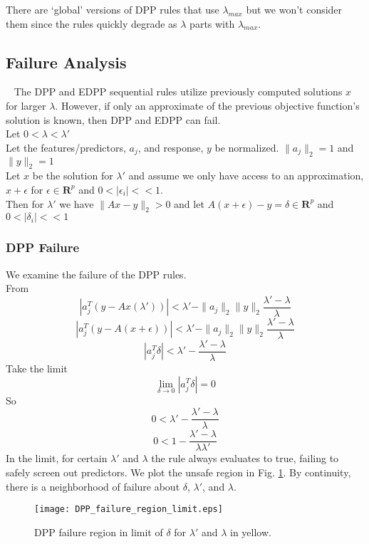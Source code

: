 \documentclass{article}
\begin{document}
There are `global' versions of DPP rules that use $\lambda_{max}$ but we won't consider them since the rules quickly degrade as $\lambda$ parts with $\lambda_{max}$.



\subsection*{Failure Analysis}

\qquad ~ The DPP and EDPP sequential rules utilize previously computed solutions $x$ for larger $\lambda$. However, if only an approximate of the previous objective function's solution is known, then DPP and EDPP can fail.\\

Let $0<\lambda<\lambda'$ \\
Let the features/predictors, $a_j$, and response, $y$ be normalized. $\|a_j\|_2=1$ and $\|y\|_2=1$\\
Let $x$ be the solution for $\lambda'$ and assume we only have access to an approximation, $x+\epsilon$ for $\epsilon\in \mathbf R^p$ and $0<|\epsilon_i|<<1$. \\
Then for $\lambda'$ we have $\|Ax-y\|_2>0$ and let $A(x+\epsilon)-y = \delta \in \mathbf R^p$ and $0<|\delta_i|<<1$

\subsubsection*{DPP Failure}
We examine the failure of the DPP rules.\\
From
$$ |a_j^T (y - Ax(\lambda'))| < \lambda' - \|a_j\|_2 \|y\|_2 \frac{\lambda'-\lambda}{\lambda} $$
$$ |a_j^T (y - A(x+\epsilon))| < \lambda' - \|a_j\|_2 \|y\|_2 \frac{\lambda'-\lambda}{\lambda} $$
$$ |a_j^T \delta| < \lambda' - \frac{\lambda'-\lambda}{\lambda} $$
Take the limit
$$ \lim_{\delta \rightarrow 0} |a_j^T \delta| = 0$$
So
$$ 0 < \lambda' - \frac{\lambda'-\lambda}{\lambda} $$
$$ 0 < 1 - \frac{\lambda'-\lambda}{\lambda\lambda'} $$
In the limit, for certain $\lambda'$ and $\lambda$ the rule always evaluates to true, failing to safely screen out predictors. We plot the unsafe region in Fig. \ref{fig:DPP_failure_region_limit}. By continuity, there is a neighborhood of failure about $\delta$, $\lambda'$, and $\lambda$.

\begin{figure}
    \centering
    {\texttt{[image: DPP\_failure\_region\_limit.eps]} }
    \caption{DPP failure region in limit of $\delta$ for $\lambda'$ and $\lambda$ in yellow.}
	\label{fig:DPP_failure_region_limit}
\end{figure}
\end{document}
